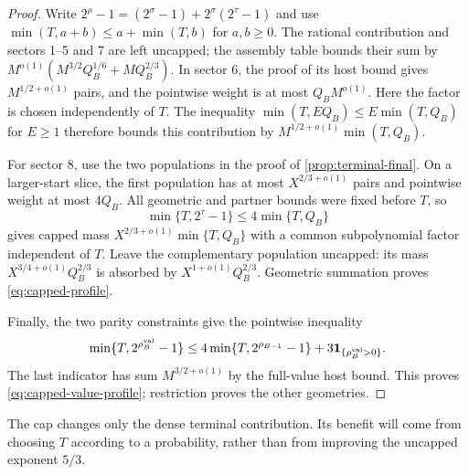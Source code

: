 \begin{proof}
Write $2^\rho-1=(2^\sigma-1)+2^\sigma(2^\tau-1)$ and use
$\min(T,a+b)\le a+\min(T,b)$ for $a,b\ge0$.
The rational contribution and sectors 1--5 and 7 are left uncapped;
the assembly table bounds their sum by
$M^{o(1)}(M^{3/2}Q_B^{1/6}+MQ_B^{2/3})$.
In sector 6, the proof of its host bound gives $M^{1/2+o(1)}$ pairs,
and the pointwise weight is at most $Q_BM^{o(1)}$. Here the factor is
chosen independently of $T$. The inequality
$\min(T,EQ_B)\le E\min(T,Q_B)$ for $E\ge1$ therefore bounds this
contribution by $M^{1/2+o(1)}\min(T,Q_B)$.

For sector 8, use the two populations in the proof of
\cref{prop:terminal-final}. On a larger-start slice, the first population
has at most $X^{2/3+o(1)}$ pairs and pointwise weight at most $4Q_B$.
All geometric and partner bounds were fixed before $T$, so
\[
 \min\{T,2^\tau-1\}\le4\min\{T,Q_B\}
\]
gives capped mass $X^{2/3+o(1)}\min\{T,Q_B\}$ with a common
subpolynomial factor independent of $T$. Leave the complementary
population uncapped: its mass
$X^{3/4+o(1)}Q_B^{2/3}$ is absorbed by $X^{1+o(1)}Q_B^{2/3}$.
Geometric summation proves \eqref{eq:capped-profile}.

Finally, the two parity constraints give the pointwise inequality
\[
 \min\{T,2^{\rho_B^{\rm val}}-1\}
 \le4\min\{T,2^{\rho_{B-1}}-1\}
                       +3\mathbf 1_{\{\rho_B^{\rm val}>0\}}.
\]
The last indicator has sum $M^{3/2+o(1)}$ by the full-value host
bound. This proves \eqref{eq:capped-value-profile}; restriction proves
the other geometries.
\end{proof}
The cap changes only the dense terminal contribution. Its benefit will
come from choosing $T$ according to a probability, rather than from
improving the uncapped exponent $5/3$.
